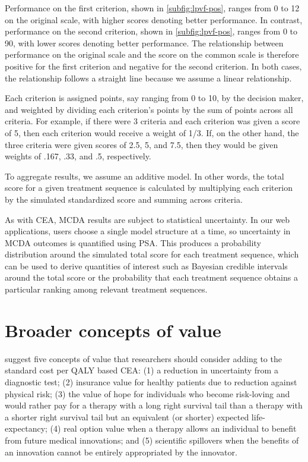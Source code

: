 \documentclass[11pt,final,fleqn]{article}\usepackage[]{graphicx}\usepackage[]{color}
\theoremstyle{plain}
\begin{document}
Performance on the first criterion, shown in \autoref{subfig:lpvf-pos}, ranges from 0 to 12 on the original scale, with higher scores denoting better performance. In contrast, performance on the second criterion, shown in \autoref{subfig:lpvf-pos}, ranges from 0 to 90, with lower scores denoting better performance. The relationship between performance on the original scale and the score on the common scale is therefore positive for the first criterion and negative for the second criterion. In both cases, the relationship follows a straight line because we assume a linear relationship.

Each criterion is assigned points, say ranging from 0 to 10, by the decision maker, and weighted by dividing each criterion's points by the sum of points across all criteria. For example, if there were 3 criteria and each criterion was given a score of 5, then each criterion would receive a weight of 1/3. If, on the other hand, the three criteria were given scores of 2.5, 5, and 7.5, then they would be given weights of .167, .33, and .5, respectively. 

To aggregate results, we assume an additive model. In other words, the total score for a given treatment sequence is calculated by multiplying each criterion by the simulated standardized score and summing across criteria.

As with CEA, MCDA results are subject to statistical uncertainty. In our web applications, users choose a single model structure at a time, so uncertainty in MCDA outcomes is quantified using PSA. This produces a probability distribution around the simulated total score for each treatment sequence, which can be used to derive quantities of interest such as Bayesian credible intervals around the total score or the probability that each treatment sequence obtains a particular ranking among relevant treatment sequences.

\section{Broader concepts of value}\label{sec:braoder-value}
\citet{garrison2017toward} suggest five concepts of value that researchers should consider adding to the standard cost per QALY based CEA: (1) a reduction in uncertainty from a diagnostic test; (2) insurance value for healthy patients due to reduction against physical risk; (3) the value of hope for individuals who become risk-loving and would rather pay for a therapy with a long right survival tail than a therapy with a shorter right survival tail but an equivalent (or shorter) expected life-expectancy; (4) real option value when a therapy allows an individual to benefit from future medical innovations; and (5) scientific spillovers when the benefits of an innovation cannot be entirely appropriated by the innovator. 
\end{document}
